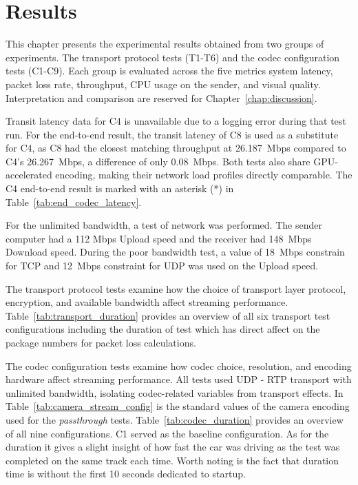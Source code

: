 \section{Results}\label{chap:results}

This chapter presents the experimental results obtained from two groups of experiments. The transport protocol tests (T1-T6) and the codec configuration tests (C1-C9). Each group is evaluated across the five metrics system latency, packet loss rate, throughput, CPU usage on the sender, and visual quality. Interpretation and comparison are reserved for Chapter~\ref{chap:discussion}.

Transit latency data for C4 is unavailable due to a logging error during that test run. For the end-to-end result, the transit latency of C8 is used as a substitute for C4, as C8 had the closest matching throughput at 26.187~Mbps compared to C4's 26.267~Mbps, a difference of only 0.08~Mbps. Both tests also share GPU-accelerated encoding, making their network load profiles directly comparable. The C4 end-to-end result is marked with an asterisk (*) in Table~\ref{tab:end_codec_latency}.

For the unlimited bandwidth, a test of network was performed. The sender computer had a 112 Mbps Upload speed and the receiver had 148~Mbps Download speed. During the poor bandwidth test, a value of 18~Mbps constrain for TCP and 12~Mbps constraint for UDP was used on the Upload speed.

The transport protocol tests examine how the choice of transport layer protocol, encryption, and available bandwidth affect streaming performance. Table~\ref{tab:transport_duration} provides an overview of all six transport test configurations including the duration of test which has direct affect on the package numbers for packet loss calculations. 



The codec configuration tests examine how codec choice, resolution, and encoding hardware affect streaming performance. All tests used UDP - RTP transport with unlimited bandwidth, isolating codec-related variables from transport effects. In Table~\ref{tab:camera_stream_config} is the standard values of the camera encoding used for the \textit{passthrough} tests. Table~\ref{tab:codec_duration} provides an overview of all nine configurations. C1 served as the baseline configuration. As for the duration it gives a slight insight of how fast the car was driving as the test was completed on the same track each time. Worth noting is the fact that duration time is without the first 10 seconds dedicated to startup.

